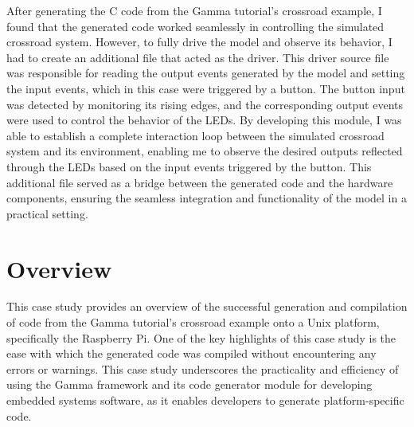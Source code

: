 After generating the C code from the Gamma tutorial's crossroad example, I found that the generated code worked seamlessly in controlling the simulated crossroad system. However, to fully drive the model and observe its behavior, I had to create an additional file that acted as the driver. This driver source file was responsible for reading the output events generated by the model and setting the input events, which in this case were triggered by a button. The button input was detected by monitoring its rising edges, and the corresponding output events were used to control the behavior of the LEDs. By developing this module, I was able to establish a complete interaction loop between the simulated crossroad system and its environment, enabling me to observe the desired outputs reflected through the LEDs based on the input events triggered by the button. This additional file served as a bridge between the generated code and the hardware components, ensuring the seamless integration and functionality of the model in a practical setting.

\section{Overview}

This case study provides an overview of the successful generation and compilation of code from the Gamma tutorial's crossroad example onto a Unix platform, specifically the Raspberry Pi. One of the key highlights of this case study is the ease with which the generated code was compiled without encountering any errors or warnings. This case study underscores the practicality and efficiency of using the Gamma framework and its code generator module for developing embedded systems software, as it enables developers to generate platform-specific code.
